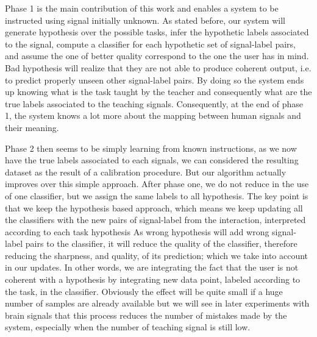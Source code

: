 Phase 1 is the main contribution of this work and enables a system to be instructed using signal initially unknown. As stated before, our system will generate hypothesis over the possible tasks, infer the hypothetic labels associated to the signal, compute a classifier for each hypothetic set of signal-label pairs, and assume the one of better quality correspond to the one the user has in mind. Bad hypothesis will realize that they are not able to produce coherent output, i.e. to predict properly unseen other signal-label pairs. By doing so the system ends up knowing what is the task taught by the teacher and consequently what are the true labels associated to the teaching signals. Consequently, at the end of phase 1, the system knows a lot more about the mapping between human signals and their meaning.

Phase 2 then seems to be simply learning from known instructions, as we now have the true labels associated to each signals, we can considered the resulting dataset as the result of a calibration procedure. But our algorithm actually improves over this simple approach. After phase one, we do not reduce in the use of one classifier, but we assign the same labels to all hypothesis. The key point is that we keep the hypothesis based approach, which means we keep updating all the classifiers with the new pairs of signal-label from the interaction, interpreted according to each task hypothesis As wrong hypothesis will add wrong signal-label pairs to the classifier, it will reduce the quality of the classifier, therefore reducing the sharpness, and quality, of its prediction; which we take into account in our updates. In other words, we are integrating the fact that the user is not coherent with a hypothesis by integrating new data point, labeled according to the task, in the classifier. Obviously the effect will be quite small if a huge number of samples are already available but we will see in later experiments with brain signals that this process reduces the number of mistakes made by the system, especially when the number of teaching signal is still low.


